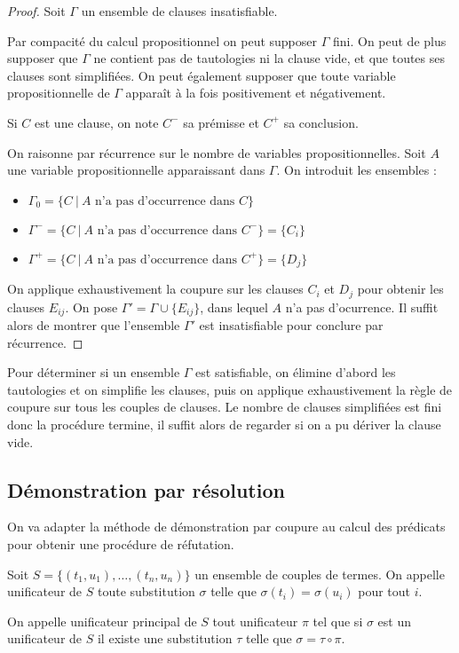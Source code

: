 \documentclass[a4paper]{article}
\begin{document}
\begin{proof}
  Soit $\Gamma$ un ensemble de clauses insatisfiable.

  Par compacité du calcul propositionnel on peut supposer $\Gamma$ fini. On peut de plus supposer que $\Gamma$ ne contient pas de tautologies ni la clause vide, et que toutes ses clauses sont simplifiées. On peut également supposer que toute variable propositionnelle de $\Gamma$ apparaît à la fois positivement et négativement.

  Si $C$ est une clause, on note $C^-$ sa prémisse et $C^+$ sa conclusion.

  On raisonne par récurrence sur le nombre de variables propositionnelles. Soit $A$ une variable propositionnelle apparaissant dans $\Gamma$. On introduit les ensembles :
  \begin{itemize}
  \item $\Gamma_0 = \{C\ |\ A\text{ n'a pas d'occurrence dans }C\}$
  \item $\Gamma^- = \{C\ |\ A\text{ n'a pas d'occurrence dans }C^-\} = \{C_i\}$
  \item $\Gamma^+ = \{C\ |\ A\text{ n'a pas d'occurrence dans }C^+\} = \{D_j\}$
  \end{itemize}

  On applique exhaustivement la coupure sur les clauses $C_i$ et $D_j$ pour obtenir les clauses $E_{ij}$. On pose $\Gamma' = \Gamma\cup\{E_{ij}\}$, dans lequel $A$ n'a pas d'ocurrence. Il suffit alors de montrer que l'ensemble $\Gamma'$ est insatisfiable pour conclure par récurrence.
\end{proof}

Pour déterminer si un ensemble $\Gamma$ est satisfiable, on élimine d'abord les tautologies et on simplifie les clauses, puis on applique exhaustivement la règle de coupure sur tous les couples de clauses. Le nombre de clauses simplifiées est fini donc la procédure termine, il suffit alors de regarder si on a pu dériver la clause vide.

\subsection{Démonstration par résolution}

On va adapter la méthode de démonstration par coupure au calcul des prédicats pour obtenir une procédure de réfutation.

\begin{definition}
  Soit $S = \{(t_1,u_1),\dots,(t_n,u_n)\}$ un ensemble de couples de termes. On appelle unificateur de $S$ toute substitution $\sigma$ telle que $\sigma(t_i)=\sigma(u_i)$ pour tout $i$.

  On appelle unificateur principal de $S$ tout unificateur $\pi$ tel que si $\sigma$ est un unificateur de $S$ il existe une substitution $\tau$ telle que $\sigma=\tau\circ\pi$.
\end{definition}
\end{document}
